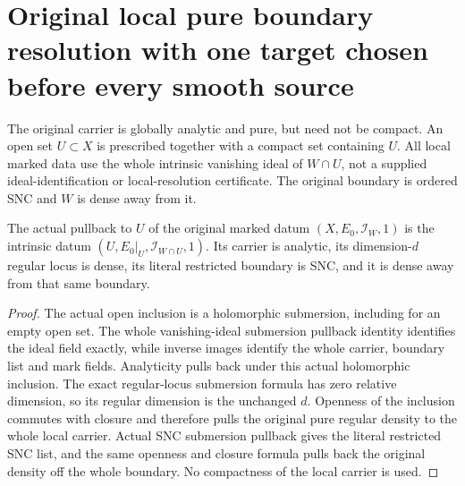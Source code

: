 \section{Original local pure boundary resolution with one target chosen before every smooth source}
\label{sec:hironaka-original-local-pure-boundary-canonical-prefix}

The original carrier is globally analytic and pure, but need not be
compact. An open set $U\subset X$ is prescribed together with a compact
set containing $U$. All local marked data use the whole intrinsic
vanishing ideal of $W\cap U$, not a supplied ideal-identification or
local-resolution certificate. The original boundary is ordered SNC
and $W$ is dense away from it.

\begin{theorem}
\label{hir:original-local-pure-boundary-whole-open-record}
The actual pullback to $U$ of the original marked datum
$(X,E_0,\mathcal I_W,1)$ is the intrinsic datum
$(U,E_0|_U,\mathcal I_{W\cap U},1)$. Its carrier is analytic,
its dimension-$d$ regular locus is dense, its literal restricted
boundary is SNC, and it is dense away from that same boundary.
\leanok
\end{theorem}
\begin{proof}
The actual open inclusion is a holomorphic submersion, including for
an empty open set. The whole vanishing-ideal submersion pullback
identity identifies the ideal field exactly, while inverse images
identify the whole carrier, boundary list and mark fields.
Analyticity pulls back under this actual holomorphic inclusion.
The exact regular-locus submersion formula has zero relative dimension,
so its regular dimension is the unchanged $d$. Openness of the
inclusion commutes with closure and therefore pulls the original
pure regular density to the whole local carrier. Actual SNC
submersion pullback gives the literal restricted SNC list, and the
same openness and closure formula pulls back the original density
off the whole boundary. No compactness of the local carrier is used.
\end{proof}

